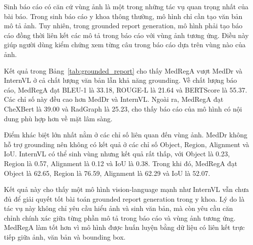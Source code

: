 \documentclass[12pt,a4paper,oneside]{extarticle}
\begin{document}
Sinh báo cáo có căn cứ vùng ảnh là một trong những tác vụ quan trọng nhất của bài báo. Trong sinh báo cáo y khoa thông thường, mô hình chỉ cần tạo văn bản mô tả ảnh. Tuy nhiên, trong grounded report generation, mô hình phải tạo báo cáo đồng thời liên kết các mô tả trong báo cáo với vùng ảnh tương ứng. Điều này giúp người dùng kiểm chứng xem từng câu trong báo cáo dựa trên vùng nào của ảnh.

Kết quả trong Bảng~\ref{tab:grounded_report} cho thấy MedRegA vượt MedDr và InternVL ở cả chất lượng văn bản lẫn khả năng grounding. Về chất lượng báo cáo, MedRegA đạt BLEU-1 là 33.18, ROUGE-L là 21.64 và BERTScore là 55.37. Các chỉ số này đều cao hơn MedDr và InternVL. Ngoài ra, MedRegA đạt CheXBert là 39.00 và RadGraph là 25.23, cho thấy báo cáo của mô hình có nội dung phù hợp hơn về mặt lâm sàng.

Điểm khác biệt lớn nhất nằm ở các chỉ số liên quan đến vùng ảnh. MedDr không hỗ trợ grounding nên không có kết quả ở các chỉ số Object, Region, Alignment và IoU. InternVL có thể sinh vùng nhưng kết quả rất thấp, với Object là 0.23, Region là 0.57, Alignment là 0.12 và IoU là 0.38. Trong khi đó, MedRegA đạt Object là 62.65, Region là 76.59, Alignment là 62.29 và IoU là 52.07.

\begin{table}[htbp]
\centering
\caption{Kết quả trên tác vụ sinh báo cáo có căn cứ vùng ảnh cho ảnh X-ray ngực}
\label{tab:grounded_report}
\end{table}

Kết quả này cho thấy một mô hình vision-language mạnh như InternVL vẫn chưa đủ để giải quyết tốt bài toán grounded report generation trong y khoa. Lý do là tác vụ này không chỉ yêu cầu hiểu ảnh và sinh văn bản, mà còn yêu cầu căn chỉnh chính xác giữa từng phần mô tả trong báo cáo và vùng ảnh tương ứng. MedRegA làm tốt hơn vì mô hình được huấn luyện bằng dữ liệu có liên kết trực tiếp giữa ảnh, văn bản và bounding box.
\end{document}
